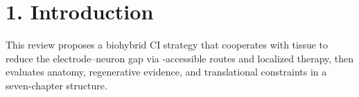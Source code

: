 \section*{1. Introduction}
This review proposes a biohybrid CI strategy that cooperates with tissue to reduce the electrode--neuron gap via \CPS-accessible routes and localized therapy, then evaluates anatomy, regenerative evidence, and translational constraints in a seven-chapter structure.
